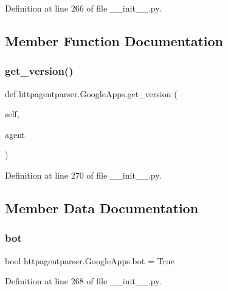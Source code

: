 Definition at line 266 of file \+\_\+\+\_\+init\+\_\+\+\_\+.\+py.



\subsection{Member Function Documentation}
\hypertarget{classhttpagentparser_1_1_google_apps_a832b312372335026855c86b9f670eb1e}{}\label{classhttpagentparser_1_1_google_apps_a832b312372335026855c86b9f670eb1e} 
\subsubsection{\texorpdfstring{get\+\_\+version()}{get\_version()}}
{\footnotesize\ttfamily def httpagentparser.\+Google\+Apps.\+get\+\_\+version (\begin{DoxyParamCaption}\item[{}]{self,  }\item[{}]{agent }\end{DoxyParamCaption})}



Definition at line 270 of file \+\_\+\+\_\+init\+\_\+\+\_\+.\+py.



\subsection{Member Data Documentation}
\hypertarget{classhttpagentparser_1_1_google_apps_a5e9358957e0c7819ee710611a286c3a0}{}\label{classhttpagentparser_1_1_google_apps_a5e9358957e0c7819ee710611a286c3a0} 
\subsubsection{\texorpdfstring{bot}{bot}}
{\footnotesize\ttfamily bool httpagentparser.\+Google\+Apps.\+bot = True\hspace{0.3cm}{\ttfamily [static]}}



Definition at line 268 of file \+\_\+\+\_\+init\+\_\+\+\_\+.\+py.

